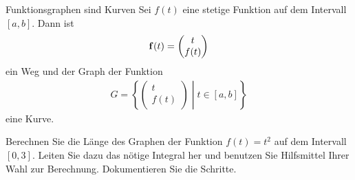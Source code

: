 \begin{frame}{Funktionsgraphen sind Kurven}
  Sei $f(t)$ eine stetige Funktion auf dem Intervall $[a,b]$. Dann ist
  \begin{gather*}
    \mathbf{f}(t) =
    \begin{pmatrix}
      t \\ f(t)
    \end{pmatrix}
  \end{gather*}
  ein Weg und der Graph der Funktion
  \begin{gather*}
    G = \left\{
      \begin{pmatrix}
        t\\f(t)
      \end{pmatrix}
      \middle|
      t\in [a,b] \right\}
  \end{gather*}
  eine Kurve.
\end{frame}

\begin{Aufgabe}
Berechnen Sie die Länge des Graphen der Funktion $f(t) = t^2$ auf dem Intervall $[0,3]$. Leiten Sie dazu das nötige Integral her und benutzen Sie Hilfsmittel Ihrer Wahl zur Berechnung. Dokumentieren Sie die Schritte.
\end{Aufgabe}

